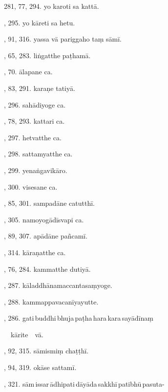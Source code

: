 281, 77, 294. yo karoti sa kattā.\hfill \pageref{sut:281}\par {}, 295. yo kāreti sa hetu.\hfill \pageref{sut:282}\par {}, 91, 316. yassa vā pariggaho taṃ sāmī.\hfill \pageref{sut:283}\par {}, 65, 283. liṅgatthe paṭhamā.\hfill \pageref{sut:284}\par {}, 70. ālapane ca.\hfill \pageref{sut:285}\par {}, 83, 291. karaṇe tatiyā.\hfill \pageref{sut:286}\par {}, 296. sahādiyoge ca.\hfill \pageref{sut:287}\par {}, 78, 293. kattari ca.\hfill \pageref{sut:288}\par {}, 297. hetvatthe ca.\hfill \pageref{sut:289}\par {}, 298. sattamyatthe ca.\hfill \pageref{sut:290}\par {}, 299. yenaṅgavikāro.\hfill \pageref{sut:291}\par {}, 300. visesane ca.\hfill \pageref{sut:292}\par {}, 85, 301. sampadāne catutthī.\hfill \pageref{sut:293}\par {}, 305. namoyogādīsvapi ca.\hfill \pageref{sut:294}\par {}, 89, 307. apādāne pañcamī.\hfill \pageref{sut:295}\par {}, 314. kāraṇatthe ca.\hfill \pageref{sut:296}\par {}, 76, 284. kammatthe dutiyā.\hfill \pageref{sut:297}\par {}, 287. kāladdhānamaccantasaṃyoge.\hfill \pageref{sut:298}\par {}, 288. kammappavacanīyayutte.\hfill \pageref{sut:299}\par {}, 286. gati\,buddhi\,bhuja\,paṭha\,hara\,kara\,sayādīnaṃ\par \noindent
\hspace{15mm}\ \ kārite\ \ vā.\hfill \pageref{sut:300}\par {}, 92, 315. sāmismiṃ chaṭṭhī.\hfill \pageref{sut:301}\par {}, 94, 319. okāse sattamī.\hfill \pageref{sut:302}\par {}, 321. sām\,issar\,ādhipati\,dāyāda\,sakkhī\,patibhū\,pasuta-\par \noindent

